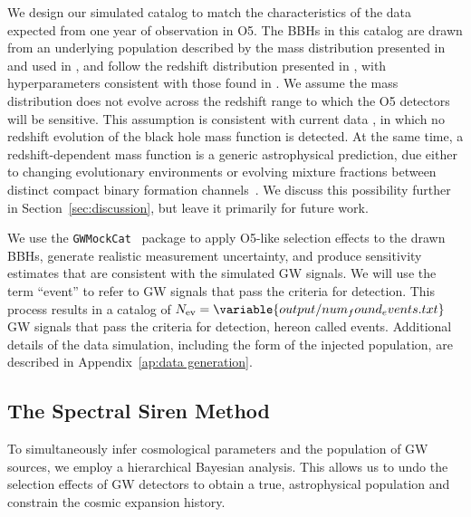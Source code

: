 \documentclass[preprint2,linenumbers]{aastex631}
\begin{document}
We design our simulated catalog to match the characteristics of the data expected from one year of observation in \ac{O5}. 
The \acp{BBH} in this catalog are drawn from an underlying population described by the \plp{} mass distribution presented in \citet{talbot_measuring_2018} and used in \citet{abbott_binary_2019, abbott_population_2023}, and follow the redshift distribution presented in \citet{callister_shouts_2020}, with hyperparameters consistent with those found in \citet{abbott_population_2023}.
We assume the mass distribution does not evolve across the redshift range to which the \ac{O5} detectors will be sensitive. 
This assumption is consistent with current data \citep{fishbach_when_2021,van_son_redshift_2022,abbott_population_2023}, in which no redshift evolution of the black hole mass function is detected.
At the same time, a redshift-dependent mass function is a generic astrophysical prediction, due either to changing evolutionary environments or evolving mixture fractions between distinct compact binary formation channels~\citep{neijssel_effect_2019,van_son_redshift_2022,2024arXiv240114837T,2024arXiv240212444Y}.
We discuss this possibility further in Section~\ref{sec:discussion}, but leave it primarily for future work.

We use the \texttt{GWMockCat}~ \citep{farah_things_2023} package to apply \ac{O5}-like selection effects to the drawn \acp{BBH}, generate realistic measurement uncertainty, and produce sensitivity estimates that are consistent with the simulated \ac{GW} signals.
We will use the term ``event'' to refer to \ac{GW} signals that pass the criteria for detection.
This process results in a catalog of $N_{\text{ev}} = \variable{output/num_found_events.txt}$ \ac{GW} signals that pass the criteria for detection, hereon called events.
Additional details of the data simulation, including the form of the injected population, are described in Appendix~\ref{ap:data generation}. 

\subsection{The Spectral Siren Method}
\label{sec:ss}
To simultaneously infer cosmological parameters and the population of \ac{GW} sources, we employ a hierarchical Bayesian analysis.
This allows us to undo the selection effects of \ac{GW} detectors to obtain a true, astrophysical population and constrain the cosmic expansion history.
\end{document}
